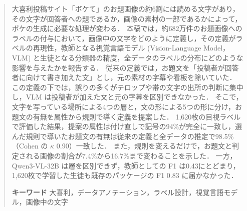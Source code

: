 \begin{abstract}
大喜利投稿サイト「ボケて」のお題画像の約6割には読める文字があり，その文字が回答者への題であるか，画像の素材の一部であるかによって，ボケの生成に必要な処理が変わる．
本稿では，約682万件のお題画像へのラベルの付与において，画像中の文字をどのように定義し，その定義がラベルの再現性，教師となる視覚言語モデル (Vision-Language Model，VLM) と生徒となる分類器の精度，全データのラベルの分布にどのような影響を与えたかを報告する．
従来の定義では，お題文を「投稿者が回答者に向けて書き加えた文」とし，元の素材の字幕や看板を除いていた．
この定義の下では，誤りの多くがテロップや帯の文字の出所の判断に集中し，VLM は投稿者が加えた文と元の字幕を区別できなかった．
そこで，文字を写っている場所による4つの層と，文の形による5つの形に分け，お題文の有無を属性から規則で導く定義を提案した．
1,620枚の目視ラベルで評価した結果，提案の属性は付け直しで記号の94\%が完全に一致し，選んだ規則で導いたお題文の有無は従来の定義と全データの推定で98.5\%（Cohen の $ \kappa $ 0.90）一致した．
また，規則を変えるだけで，お題文と判定される画像の割合が7.4\%から16.7\%まで変わることを示した．
一方，Qwen3-VL-32B は層を区別できず，教師としての F1 は0.43にとどまり，1,620枚で学習した生徒も既存のパッケージの F1 0.83 に届かなかった．
\par
\noindent
{\bf キーワード} 大喜利，データアノテーション，ラベル設計，視覚言語モデル，画像中の文字
\end{abstract}

